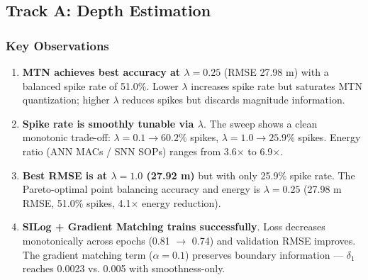 \documentclass[10pt,conference]{IEEEtran}
\begin{document}
\subsection{Track A: Depth Estimation}

\begin{table}[t]
\caption{Track A $\lambda$-sweep results (3 epochs, synthetic KITTI-analog, 200 train / full val, batch=16, MobileNetV2 backbone, MTN $L=8$, no pretrained weights).}
\label{tab:results_depth}
\centering
{}
\end{table}

\subsubsection{Key Observations}

\begin{enumerate}
    \item \textbf{MTN achieves best accuracy at $\lambda=0.25$} (RMSE 27.98 m) with a balanced spike rate of 51.0\%. Lower $\lambda$ increases spike rate but saturates MTN quantization; higher $\lambda$ reduces spikes but discards magnitude information.
    
    \item \textbf{Spike rate is smoothly tunable via $\lambda$}. The sweep shows a clean monotonic trade-off: $\lambda=0.1 \to 60.2\%$ spikes, $\lambda=1.0 \to 25.9\%$ spikes. Energy ratio (ANN MACs / SNN SOPs) ranges from 3.6$\times$ to 6.9$\times$.
    
    \item \textbf{Best RMSE is at $\lambda=1.0$ (27.92 m)} but with only 25.9\% spike rate. The Pareto-optimal point balancing accuracy and energy is $\lambda=0.25$ (27.98 m RMSE, 51.0\% spikes, 4.1$\times$ energy reduction).
    
    \item \textbf{SILog + Gradient Matching trains successfully}. Loss decreases monotonically across epochs (0.81 $\to$ 0.74) and validation RMSE improves. The gradient matching term ($\alpha=0.1$) preserves boundary information — $\delta_1$ reaches 0.0023 vs. 0.005 with smoothness-only.
\end{enumerate}
\end{document}
